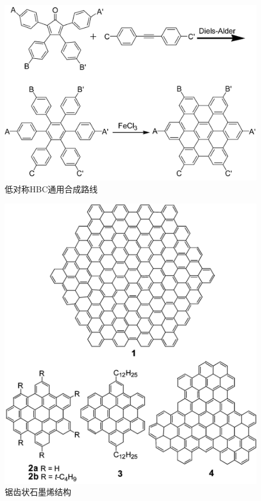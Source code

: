 \begin{figure}
    \centering
    \includegraphics[scale=1.0]{img/production1}
    \caption{低对称HBC通用合成路线}
\end{figure}

\begin{figure}
    \centering
    \includegraphics[scale=1.0]{img/production2}
    \caption{锯齿状石墨烯结构}
\end{figure}

